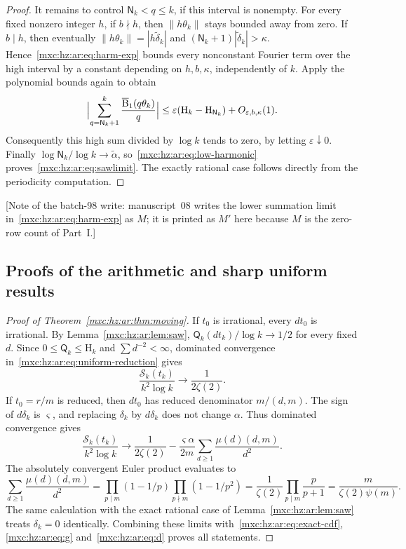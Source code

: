 \documentclass[11pt]{article}
\numberwithin{equation}{section}
\theoremstyle{definition}
\theoremstyle{remark}
\begin{document}
\begin{proof}
It remains to control $\mathsf N_k<q\le k$, if this interval is nonempty.
For every fixed nonzero integer $h$, if $b\nmid h$, then $\|h\theta_k\|$
stays bounded away from zero. If $b\mid h$, then eventually
$\|h\theta_k\|=|h\widetilde\delta_k|$ and
$(\mathsf N_k+1)|\widetilde\delta_k|>\kappa$.
Hence~\eqref{mxc:hz:ar:eq:harm-exp} bounds every nonconstant Fourier term
over the high interval by a constant depending on $h,b,\kappa$,
independently of $k$. Apply the polynomial bounds again to obtain
\[
 \Bigl|\sum_{q=\mathsf N_k+1}^k\frac{\overline{\mathrm B}_1(q\theta_k)}q\Bigr|
 \le\varepsilon(\mathrm H_k-\mathrm H_{\mathsf N_k})+O_{\varepsilon,b,\kappa}(1).
\]
Consequently this high sum divided by $\log k$ tends to zero, by letting
$\varepsilon\downarrow0$. Finally $\log\mathsf N_k/\log k\to\widetilde\alpha$,
so~\eqref{mxc:hz:ar:eq:low-harmonic} proves~\eqref{mxc:hz:ar:eq:sawlimit}.
The exactly rational case follows directly from the periodicity
computation.
\end{proof}

[Note of the batch-98 write: manuscript~08 writes the lower summation limit
in~\eqref{mxc:hz:ar:eq:harm-exp} as $M$; it is printed as $M'$ here because
$M$ is the zero-row count of Part~I.]

\subsection{Proofs of the arithmetic and sharp uniform results}

\begin{proof}[Proof of Theorem~\ref{mxc:hz:ar:thm:moving}]
If $t_0$ is irrational, every $dt_0$ is irrational. By
Lemma~\ref{mxc:hz:ar:lem:saw}, $\mathsf Q_k(dt_k)/\log k\to1/2$ for every
fixed $d$. Since $0\le\mathsf Q_k\le\mathrm H_k$ and $\sum d^{-2}<\infty$,
dominated convergence in~\eqref{mxc:hz:ar:eq:uniform-reduction} gives
\[
 \frac{\mathcal S_k(t_k)}{k^2\log k}\longrightarrow\frac1{2\zeta(2)}.
\]
If $t_0=r/m$ is reduced, then $dt_0$ has reduced denominator $m/(d,m)$.
The sign of $d\delta_k$ is $\varsigma$, and replacing $\delta_k$ by
$d\delta_k$ does not change $\alpha$. Thus dominated convergence gives
\[
 \frac{\mathcal S_k(t_k)}{k^2\log k}
 \longrightarrow\frac1{2\zeta(2)}
 -\frac{\varsigma\alpha}{2m}\sum_{d\ge1}\frac{\mu(d)(d,m)}{d^2}.
\]
The absolutely convergent Euler product evaluates to
\[
 \sum_{d\ge1}\frac{\mu(d)(d,m)}{d^2}
 =\prod_{p\mid m}(1-1/p)\prod_{p\nmid m}(1-1/p^2)
 =\frac1{\zeta(2)}\prod_{p\mid m}\frac p{p+1}
 =\frac m{\zeta(2)\psi(m)}.
\]
The same calculation with the exact rational case of
Lemma~\ref{mxc:hz:ar:lem:saw} treats $\delta_k=0$ identically. Combining
these limits with~\eqref{mxc:hz:ar:eq:exact-cdf}, \eqref{mxc:hz:ar:eq:g}
and~\eqref{mxc:hz:ar:eq:d} proves all statements.
\end{proof}
\end{document}
